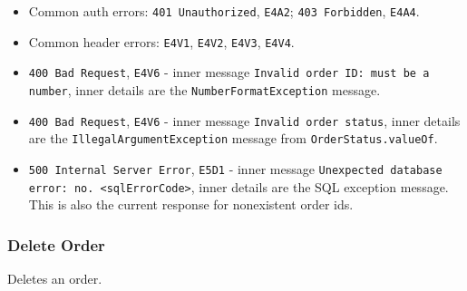 \begin{itemize}[nosep]
\begin{itemize}[nosep]
\item Common auth errors: \texttt{401 Unauthorized}, \texttt{E4A2}; \texttt{403 Forbidden}, \texttt{E4A4}.
\item Common header errors: \texttt{E4V1}, \texttt{E4V2}, \texttt{E4V3}, \texttt{E4V4}.
\item \texttt{400 Bad Request}, \texttt{E4V6} - inner message \texttt{Invalid order ID: must be a number}, inner details are the \texttt{NumberFormatException} message.
\item \texttt{400 Bad Request}, \texttt{E4V6} - inner message \texttt{Invalid order status}, inner details are the \texttt{IllegalArgumentException} message from \texttt{OrderStatus.valueOf}.
\item \texttt{500 Internal Server Error}, \texttt{E5D1} - inner message \texttt{Unexpected database error: no. <sqlErrorCode>}, inner details are the SQL exception message. This is also the current response for nonexistent order ids.
\end{itemize}

\end{itemize}

\subsubsection*{Delete Order}

Deletes an order.

